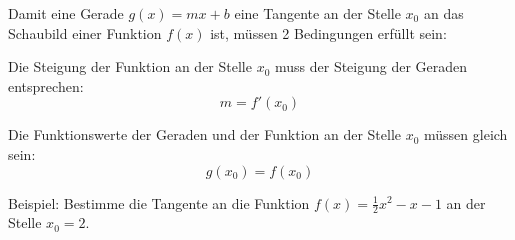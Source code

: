 Damit eine Gerade \(g(x)=mx+b\) eine Tangente an der Stelle \(x_0\) an das Schaubild einer Funktion \(f(x)\) ist, müssen 2 Bedingungen erfüllt sein:
\begin{tcolorbox}

    \bigskip

	\textcolor{loestc}{Die Steigung der Funktion an der Stelle \(x_0\) muss der Steigung der Geraden entsprechen:
		\[m=f'(x_0)\]}
\end{tcolorbox}
\begin{tcolorbox}

    \bigskip

	\textcolor{loestc}{Die Funktionswerte der Geraden und der Funktion an der Stelle \(x_0\) müssen gleich sein:
		\[g(x_0)=f(x_0)\]}
\end{tcolorbox}
Beispiel: Bestimme die Tangente an die Funktion \(f(x)=\frac{1}{2}x^2-x-1\) an der Stelle \(x_0=2\).\vspace{0.5cm}
